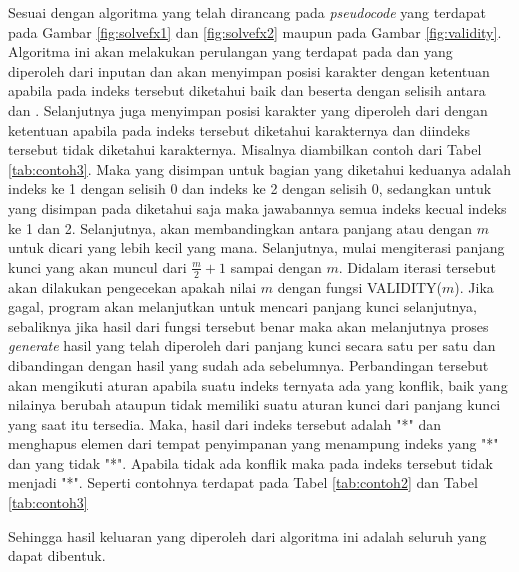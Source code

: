 \indent Sesuai dengan algoritma yang telah dirancang pada \textit{pseudocode} yang terdapat pada Gambar \ref{fig:solvefx1} dan \ref{fig:solvefx2} maupun pada Gambar \ref{fig:validity}. Algoritma ini akan melakukan perulangan yang terdapat pada \plaintext dan \ciphertext yang diperoleh dari inputan dan akan menyimpan posisi karakter dengan ketentuan apabila pada indeks tersebut diketahui baik \plaintext dan \ciphertext beserta dengan selisih antara \ciphertext dan \plaintext. Selanjutnya juga menyimpan posisi karakter yang diperoleh dari \ciphertext dengan ketentuan apabila \ciphertext pada indeks tersebut diketahui karakternya dan \plaintext diindeks tersebut tidak diketahui karakternya. Misalnya diambilkan contoh dari Tabel \ref{tab:contoh3}. Maka yang disimpan untuk bagian yang diketahui keduanya adalah indeks ke 1 dengan selisih 0 dan indeks ke 2 dengan selisih 0, sedangkan untuk yang disimpan pada diketahui \ciphertext saja maka jawabannya semua indeks kecual indeks ke 1 dan 2. Selanjutnya, akan membandingkan antara panjang \plaintext atau \ciphertext dengan $m$ untuk dicari yang lebih kecil yang mana. Selanjutnya, mulai mengiterasi panjang kunci yang akan muncul dari $\frac{m}{2}+1$ sampai dengan $m$. Didalam iterasi tersebut akan dilakukan pengecekan apakah nilai $m$ dengan fungsi VALIDITY($m$). Jika gagal, program akan melanjutkan untuk mencari panjang kunci selanjutnya, sebaliknya jika hasil dari fungsi tersebut benar maka akan melanjutnya proses \textit{generate} hasil yang telah diperoleh dari panjang kunci secara satu per satu dan dibandingan dengan hasil yang sudah ada sebelumnya. Perbandingan tersebut akan mengikuti aturan apabila suatu indeks ternyata ada yang konflik, baik yang nilainya berubah ataupun tidak memiliki suatu aturan kunci dari panjang kunci yang saat itu tersedia. Maka, hasil dari indeks tersebut adalah "*" dan menghapus elemen dari tempat penyimpanan yang menampung indeks \plaintext yang "*" dan \ciphertext yang tidak "*". Apabila tidak ada konflik maka \plaintext pada indeks tersebut tidak menjadi "*". Seperti contohnya terdapat pada Tabel \ref{tab:contoh2} dan Tabel \ref{tab:contoh3}  


\indent Sehingga hasil keluaran yang diperoleh dari algoritma ini adalah seluruh \plaintext yang dapat dibentuk.

